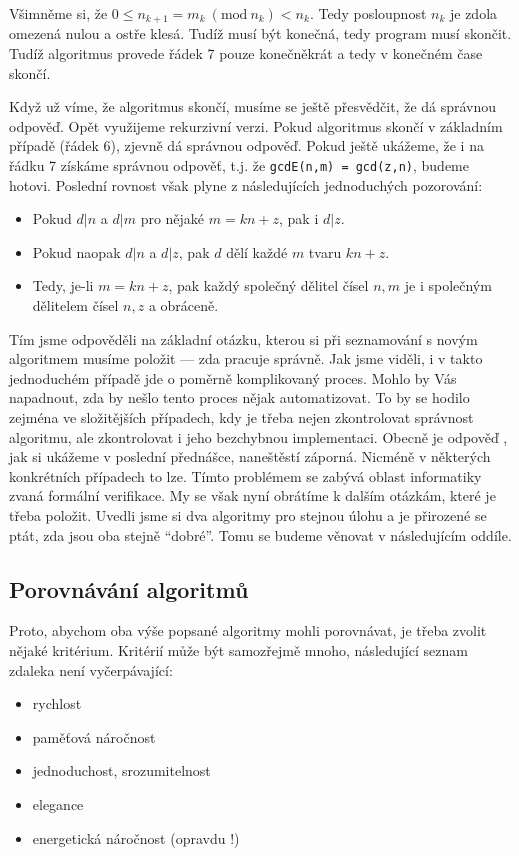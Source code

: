 Všimněme si, že $0\leq n_{k+1} = m_k\ (\mbox{mod}\ n_k) <n_k$. Tedy posloupnost $n_k$ je zdola omezená
nulou a ostře klesá. Tudíž musí být konečná, tedy program musí skončit. Tudíž algoritmus provede řádek 7 pouze konečněkrát a tedy v konečném
čase skončí.

Když už víme, že algoritmus skončí, musíme se ještě přesvědčit, že dá správnou odpověď.  Opět využijeme rekurzivní verzi.  Pokud algoritmus
skončí v základním případě (řádek 6), zjevně dá správnou odpověď. Pokud ještě ukážeme, že i na řádku 7 získáme správnou odpověť, t.j. že {\tt gcdE(n,m) = gcd(z,n)},
budeme hotovi. Poslední rovnost však plyne z následujících jednoduchých pozorování:

\begin{itemize}
 \item Pokud $d|n$ a $d|m$ pro nějaké $m = kn + z$, pak i $d|z$.
 \item Pokud naopak $d|n$ a $d|z$, pak $d$ dělí každé $m$ tvaru $ kn + z$.
 \item Tedy, je-li $m = kn + z$, pak každý společný dělitel čísel $n,m$ je i společným dělitelem čísel $n,z$ a obráceně.
\end{itemize}

Tím jsme odpověděli na základní otázku, kterou si při seznamování s novým algoritmem musíme položit --- zda pracuje správně. Jak jsme viděli, i v takto jednoduchém
případě jde o poměrně komplikovaný proces. Mohlo by Vás napadnout, zda by nešlo tento proces nějak automatizovat. To by se hodilo zejména ve složitějších případech,
kdy je třeba nejen zkontrolovat správnost algoritmu, ale zkontrolovat i jeho bezchybnou implementaci. Obecně je odpověď , jak si ukážeme v poslední přednášce, naneštěstí
záporná. Nicméně v některých konkrétních případech to lze. Tímto problémem se zabývá oblast informatiky zvaná formální verifikace.  My se však nyní obrátíme k dalším
otázkám, které je třeba položit. Uvedli jsme si dva algoritmy pro stejnou úlohu a je přirozené se ptát, zda jsou oba stejně ``dobré''.  Tomu se budeme věnovat v následujícím oddíle.

\subsection*{Porovnávání algoritmů}
Proto, abychom oba výše popsané algoritmy mohli porovnávat, je třeba zvolit nějaké kritérium. Kritérií může být samozřejmě mnoho,
následující seznam zdaleka není vyčerpávající:

\begin{itemize}
 \item rychlost
 \item paměťová náročnost
 \item jednoduchost, srozumitelnost
 \item elegance
 \item energetická náročnost (opravdu !)
\end{itemize}

